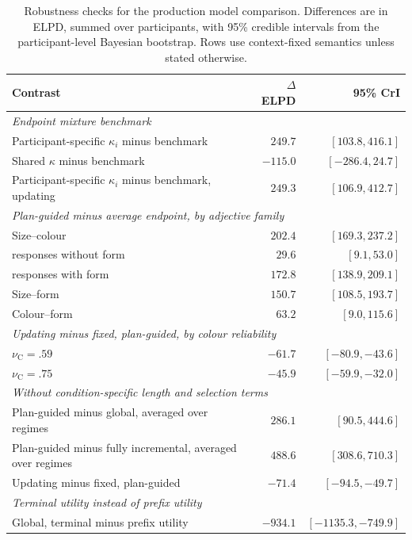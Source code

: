 \documentclass[10pt,a4paper,fleqn]{article}
\begin{document}
\begin{table}[!htbp]
\centering
\small
\caption{Robustness checks for the production model comparison.
Differences are in ELPD, summed over participants, with 95\% credible intervals from the participant-level Bayesian bootstrap.
Rows use context-fixed semantics unless stated otherwise.}
\label{tab:robustness-checks}
\begin{tabularx}{\textwidth}{X r r}
\toprule
Contrast & $\Delta$ELPD & 95\% CrI \\
\midrule
\multicolumn{3}{l}{\emph{Endpoint mixture benchmark}} \\
Participant-specific $\kappa_i$ minus benchmark & $249.7$ & $[103.8, 416.1]$ \\
Shared $\kappa$ minus benchmark & $-115.0$ & $[-286.4, 24.7]$ \\
Participant-specific $\kappa_i$ minus benchmark, updating & $249.3$ & $[106.9, 412.7]$ \\
\midrule
\multicolumn{3}{l}{\emph{Plan-guided minus average endpoint, by adjective family}} \\
Size--colour & $202.4$ & $[169.3, 237.2]$ \\
\quad responses without form & $29.6$ & $[9.1, 53.0]$ \\
\quad responses with form & $172.8$ & $[138.9, 209.1]$ \\
Size--form & $150.7$ & $[108.5, 193.7]$ \\
Colour--form & $63.2$ & $[9.0, 115.6]$ \\
\midrule
\multicolumn{3}{l}{\emph{Updating minus fixed, plan-guided, by colour reliability}} \\
$\nu_{\mathrm C}=.59$ & $-61.7$ & $[-80.9, -43.6]$ \\
$\nu_{\mathrm C}=.75$ & $-45.9$ & $[-59.9, -32.0]$ \\
\midrule
\multicolumn{3}{l}{\emph{Without condition-specific length and selection terms}} \\
Plan-guided minus global, averaged over regimes & $286.1$ & $[90.5, 444.6]$ \\
Plan-guided minus fully incremental, averaged over regimes & $488.6$ & $[308.6, 710.3]$ \\
Updating minus fixed, plan-guided & $-71.4$ & $[-94.5, -49.7]$ \\
\midrule
\multicolumn{3}{l}{\emph{Terminal utility instead of prefix utility}} \\
Global, terminal minus prefix utility & $-934.1$ & $[-1135.3, -749.9]$ \\

\end{tabularx}
\end{table}
\end{document}
